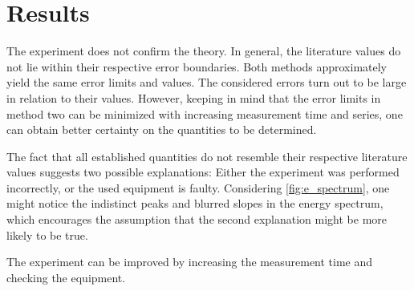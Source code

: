\chapter{Results}
The experiment does not confirm the theory.
In general, the literature values do not lie within their respective error boundaries.
Both methods approximately yield the same error limits and values.
The considered errors turn out to be large in relation to their values.
However, keeping in mind that the error limits in method two can be minimized with increasing measurement time and series, one can obtain better certainty on the quantities to be determined.

The fact that all established quantities do not resemble their respective literature values suggests two possible explanations:
Either the experiment was performed incorrectly, or the used equipment is faulty.
Considering \autoref{fig:e_spectrum}, one might notice the indistinct peaks and blurred slopes in the energy spectrum, which encourages the assumption that the second explanation might be more likely to be true.

The experiment can be improved by increasing the measurement time and checking the equipment.
